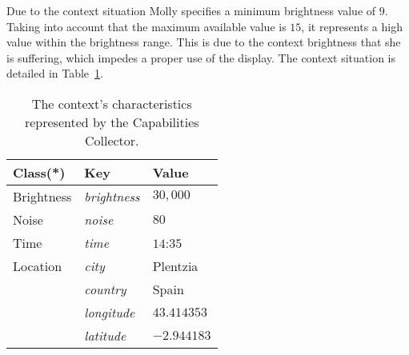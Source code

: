 Due to the context situation Molly specifies a minimum brightness value of $9$.
Taking into account that the maximum available value is $15$, it represents a
high value within the brightness range. This is due to the context brightness that
she is suffering, which impedes a proper use of the display. The context situation
is detailed in Table~\ref{tbl:context}.

\begin{table}
 \caption{The context's characteristics represented by the Capabilities Collector.}
 \label{tbl:context}
 \footnotesize
 \centering
\begin{tabular}{l l l}
  \hline 
  \textbf{Class(*)}& \textbf{Key} & \textbf{Value}		\\
  \hline
  Brightness	& \textit{brightness}		& $30,000$	\\
  Noise		& \textit{noise}		& $80$		\\
  Time		& \textit{time}			& $14$:$35$	\\
  Location	& \textit{city}			& Plentzia	\\
		& \textit{country}		& Spain		\\
		& \textit{longitude}		& $43.414353$	\\
		& \textit{latitude} 		& $-2.944183$	\\	
  \hline
\end{tabular}
\end{table}


% 


